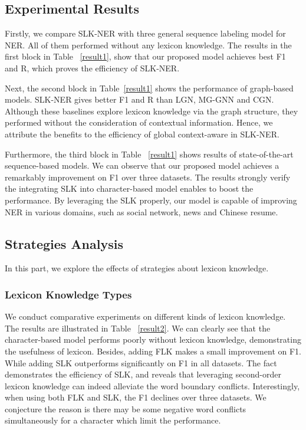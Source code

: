 \documentclass[conference]{IEEEtran}
\begin{document}
 






        

\subsection{Experimental Results}






Firstly, we compare SLK-NER with three general sequence labeling model for NER. 
All of them performed without any lexicon knowledge.
The results in the first block in Table ~\ref{result1},
show that our proposed model achieves best F1 and R,
which proves the efficiency of SLK-NER. 


Next, the second block in Table~\ref{result1} shows the performance of graph-based models.
SLK-NER gives better F1 and R than LGN, MG-GNN and CGN.
Although these baselines explore lexicon knowledge via the graph structure,
they performed without the consideration of contextual information.
Hence, we attribute the benefits to the efficiency of global context-aware in SLK-NER. 


Furthermore, the third block in Table ~\ref{result1} shows results of state-of-the-art sequence-based models.
We can observe that our proposed model achieves a remarkably improvement on F1 over three datasets. 
The results strongly verify the integrating SLK into character-based model 
enables to boost the performance.
By leveraging the SLK properly, 
our model is capable of improving NER in various domains, such as social network, news and Chinese resume.




\subsection{Strategies Analysis}
In this part, we explore the effects of strategies about lexicon knowledge.



\subsubsection{Lexicon Knowledge Types}
We conduct comparative experiments on different kinds of lexicon knowledge.
The results are illustrated in Table ~\ref{result2}.
We can clearly see that the character-based model performs poorly without lexicon knowledge,
demonstrating the usefulness of lexicon.
Besides, adding FLK makes a small improvement on F1.
While adding SLK outperforms significantly on F1 in all datasets.
The fact demonstrates the efficiency of SLK,
and reveals that leveraging second-order lexicon knowledge can indeed alleviate the word boundary conflicts.
Interestingly, when using both FLK and SLK, the F1 declines over three datasets. 
We conjecture the reason is there may be
some negative word conflicts simultaneously for a character
which limit the performance. 
\end{document}
